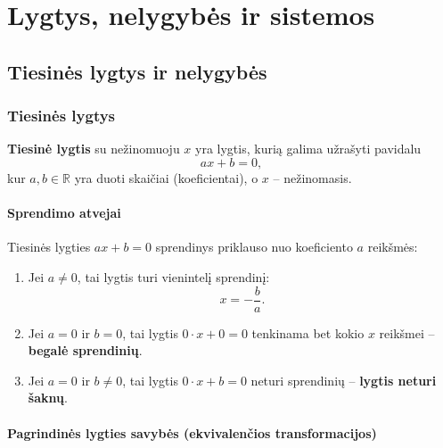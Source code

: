 \chapter{Lygtys, nelygybės ir sistemos}

\section{Tiesinės lygtys ir nelygybės}

\subsection{Tiesinės lygtys}

\begin{definition}
\textbf{Tiesinė lygtis} su nežinomuoju $x$ yra lygtis, kurią galima užrašyti pavidalu
\[
ax + b = 0,
\]
kur $a, b \in \mathbb{R}$ yra duoti skaičiai (koeficientai), o $x$ – nežinomasis.
\end{definition}

\subsubsection{Sprendimo atvejai}

Tiesinės lygties $ax + b = 0$ sprendinys priklauso nuo koeficiento $a$ reikšmės:

\begin{tcolorbox}[title=Tiesinės lygties sprendimo atvejai, colback=blue!5, colframe=blue!50!black]
\begin{enumerate}
    \item Jei $a \neq 0$, tai lygtis turi vienintelį sprendinį:
    \[
        x = -\frac{b}{a}.
    \]
    \item Jei $a = 0$ ir $b = 0$, tai lygtis $0 \cdot x + 0 = 0$ tenkinama bet kokio $x$ reikšmei – \textbf{begalė sprendinių}.
    \item Jei $a = 0$ ir $b \neq 0$, tai lygtis $0 \cdot x + b = 0$ neturi sprendinių – \textbf{lygtis neturi šaknų}.
\end{enumerate}
\end{tcolorbox}

\subsubsection{Pagrindinės lygties savybės (ekvivalenčios transformacijos)}

